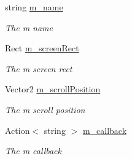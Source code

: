 \begin{DoxyCompactItemize}
string \hyperlink{class_lerp2_a_p_i_1_1_utility_1_1_file_browser_afa53a570f3d3e18b078af3a6e12a3085}{m\+\_\+name}
\begin{DoxyCompactList}\small\item\em The m name \end{DoxyCompactList}\item 
Rect \hyperlink{class_lerp2_a_p_i_1_1_utility_1_1_file_browser_a848e2a24a604ded6b810c0274f4abf49}{m\+\_\+screen\+Rect}
\begin{DoxyCompactList}\small\item\em The m screen rect \end{DoxyCompactList}\item 
Vector2 \hyperlink{class_lerp2_a_p_i_1_1_utility_1_1_file_browser_a3b8a38f675fd8e67d6197135b3d609b6}{m\+\_\+scroll\+Position}
\begin{DoxyCompactList}\small\item\em The m scroll position \end{DoxyCompactList}\item 
Action$<$ string $>$ \hyperlink{class_lerp2_a_p_i_1_1_utility_1_1_file_browser_ab12fa26935e814901609c1cab44c6f84}{m\+\_\+callback}
\begin{DoxyCompactList}\small\item\em The m callback \end{DoxyCompactList}\end{DoxyCompactItemize}
